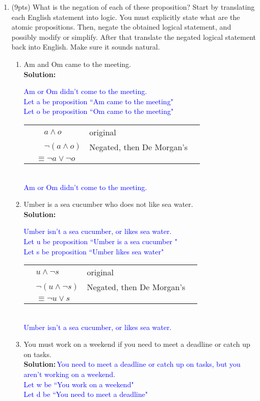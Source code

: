 \documentclass{article}
\newcommand{\sol}[1]{\textbf{Solution:\,}\textcolor{blue}{#1}}
\begin{document}
\begin{enumerate}
\newpage

\item(9pts) What is the negation of each of these proposition? Start by translating each English statement into logic. You must explicitly state what are the atomic propositions. Then, negate the obtained logical statement, and possibly modify or simplify. After that translate the negated logical statement back into English. Make sure it sounds natural.

\begin{enumerate}
\item Am and Om came to the meeting.
\\\sol{Am or Om didn't come to the meeting.
\\Let a be proposition ``Am came to the meeting"
\\Let o be proposition ``Om came to the meeting"
\\\begin{tabular}{llll}
&$\quad a \land o$ &original \\
&$\quad\neg(a \land o)$ & Negated, then De Morgan's\\
&$\equiv\neg a\lor\neg o$& \\
\end{tabular}
\\ Am or Om didn't come to the meeting.
}
\item Umber is a sea cucumber who does not like sea water.
\\\sol{Umber isn't a sea cucumber, or likes sea water.
\\Let u be proposition ``Umber is a sea cucumber "
\\Let s be proposition ``Umber likes sea water"
\\\begin{tabular}{llll}
&\quad$u \land \neg s$ &original\\
&\quad$\neg(u \land \neg s)$& Negated, then De Morgan's\\
&$\equiv\neg u \lor s$\\
\end{tabular}
\\ Umber isn't a sea cucumber, or likes sea water.
}
\item You must work on a weekend if you need to meet a deadline or catch up on tasks.
\\\sol{You need to meet a deadline or catch up on tasks, but you aren't working on a weekend.
\\Let w be ``You work on a weekend"
\\Let d be ``You need to meet a deadline"
}
\end{enumerate}
\end{enumerate}
\end{document}
